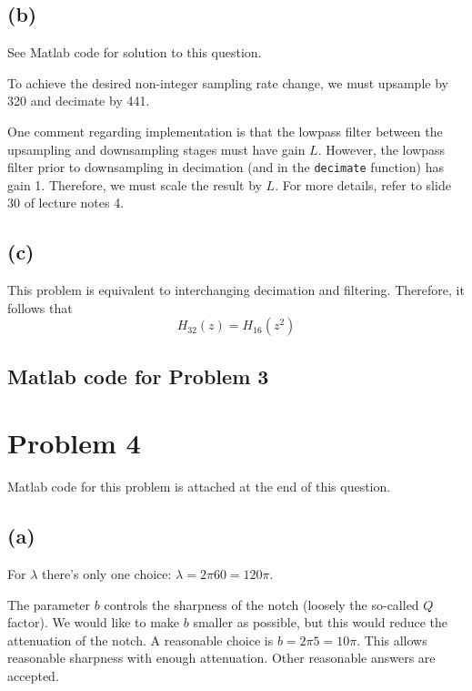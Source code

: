 \documentclass{article}
\begin{document}
\FloatBarrier

\subsection{(b)}

See Matlab code for solution to this question.

To achieve the desired non-integer sampling rate change, we must upsample by 320 and decimate by 441.

One comment regarding implementation is that the lowpass filter between the upsampling and downsampling stages must have gain $L$. However, the lowpass filter prior to downsampling in decimation (and in the \texttt{decimate} function) has gain 1. Therefore, we must scale the result by $L$. For more details, refer to slide 30 of lecture notes 4.

\subsection{(c)}

This problem is equivalent to interchanging decimation and filtering. Therefore, it follows that
\begin{equation}
	H_{32}(z) = H_{16}(z^2)
\end{equation}

\subsection{Matlab code for Problem 3}



\newpage
\section{Problem 4}

Matlab code for this problem is attached at the end of this question.

\subsection{(a)}

For $\lambda$ there's only one choice: $\lambda = 2\pi60 = 120\pi$.

The parameter $b$ controls the sharpness of the notch (loosely the so-called $Q$ factor). We would like to make $b$ smaller as possible, but this would reduce the attenuation of the notch. A reasonable choice is $b = 2\pi 5 = 10\pi$. This allows reasonable sharpness with enough attenuation. Other reasonable answers are accepted.
\end{document}
